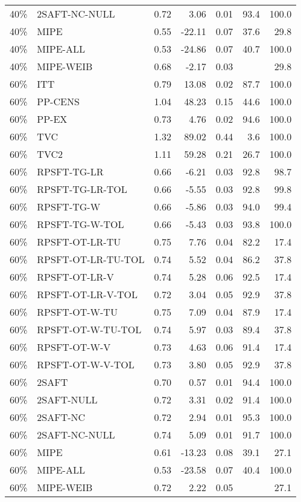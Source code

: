 \begin{table}[ht]
{\begin{tabular}{llrrrrr}
  40\% & 2SAFT-NC-NULL & 0.72 & 3.06 & 0.01 & 93.4 & 100.0 \\ 
  40\% & MIPE & 0.55 & -22.11 & 0.07 & 37.6 & 29.8 \\ 
  40\% & MIPE-ALL & 0.53 & -24.86 & 0.07 & 40.7 & 100.0 \\ 
  40\% & MIPE-WEIB & 0.68 & -2.17 & 0.03 &  & 29.8 \\ 
   \hline
60\% & ITT & 0.79 & 13.08 & 0.02 & 87.7 & 100.0 \\ 
  60\% & PP-CENS & 1.04 & 48.23 & 0.15 & 44.6 & 100.0 \\ 
  60\% & PP-EX & 0.73 & 4.76 & 0.02 & 94.6 & 100.0 \\ 
  60\% & TVC & 1.32 & 89.02 & 0.44 & 3.6 & 100.0 \\ 
  60\% & TVC2 & 1.11 & 59.28 & 0.21 & 26.7 & 100.0 \\ 
   \hline
60\% & RPSFT-TG-LR & 0.66 & -6.21 & 0.03 & 92.8 & 98.7 \\ 
  60\% & RPSFT-TG-LR-TOL & 0.66 & -5.55 & 0.03 & 92.8 & 99.8 \\ 
  60\% & RPSFT-TG-W & 0.66 & -5.86 & 0.03 & 94.0 & 99.4 \\ 
  60\% & RPSFT-TG-W-TOL & 0.66 & -5.43 & 0.03 & 93.8 & 100.0 \\ 
  60\% & RPSFT-OT-LR-TU & 0.75 & 7.76 & 0.04 & 82.2 & 17.4 \\ 
  60\% & RPSFT-OT-LR-TU-TOL & 0.74 & 5.52 & 0.04 & 86.2 & 37.8 \\ 
  60\% & RPSFT-OT-LR-V & 0.74 & 5.28 & 0.06 & 92.5 & 17.4 \\ 
  60\% & RPSFT-OT-LR-V-TOL & 0.72 & 3.04 & 0.05 & 92.9 & 37.8 \\ 
   \hline
60\% & RPSFT-OT-W-TU & 0.75 & 7.09 & 0.04 & 87.9 & 17.4 \\ 
  60\% & RPSFT-OT-W-TU-TOL & 0.74 & 5.97 & 0.03 & 89.4 & 37.8 \\ 
  60\% & RPSFT-OT-W-V & 0.73 & 4.63 & 0.06 & 91.4 & 17.4 \\ 
  60\% & RPSFT-OT-W-V-TOL & 0.73 & 3.80 & 0.05 & 92.9 & 37.8 \\ 
   \hline
60\% & 2SAFT & 0.70 & 0.57 & 0.01 & 94.4 & 100.0 \\ 
  60\% & 2SAFT-NULL & 0.72 & 3.31 & 0.02 & 91.4 & 100.0 \\ 
  60\% & 2SAFT-NC & 0.72 & 2.94 & 0.01 & 95.3 & 100.0 \\ 
  60\% & 2SAFT-NC-NULL & 0.74 & 5.09 & 0.01 & 91.7 & 100.0 \\ 
  60\% & MIPE & 0.61 & -13.23 & 0.08 & 39.1 & 27.1 \\ 
  60\% & MIPE-ALL & 0.53 & -23.58 & 0.07 & 40.4 & 100.0 \\ 
  60\% & MIPE-WEIB & 0.72 & 2.22 & 0.05 &  & 27.1 \\ 
   \hline
\end{tabular}
}
\end{table}
